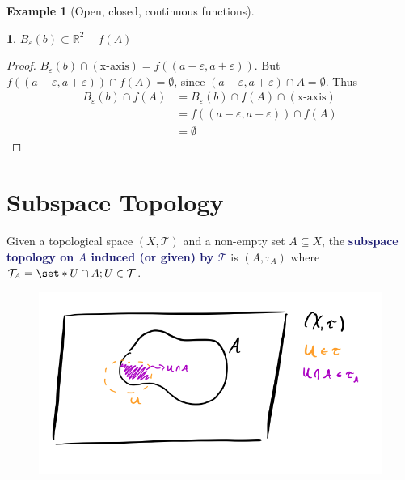 \documentclass[11pt]{article}
\numberwithin{equation}{section}
\newcommand{\navy}[1]{\textcolor{MidnightBlue}{\bf #1}}
\newcounter{theo}[section]\setcounter{theo}{0}
\theoremstyle{definition}
\newtheorem{claim}{\color{ForestGreen}{\textbf{Claim}}}[section]
\theoremstyle{definition}
\newtheorem{example}{\color{WildStrawberry}Example}[section]
\def\Set{\set*}%
\def\ss{\subset}
\def\sse{\subseteq}
\newcommand{\1}{\mathbbm 1}
\def\t{\tau}
\newcommand{\e}{\varepsilon}
\newcommand{\RR}{\mathbb R}
\newcommand{\tT}{\mathcal T}
\begin{document}
\begin{example}[Open, closed, continuous functions]
\begin{enumerate}
\begin{enumerate}
\begin{enumerate}
		 	 	\begin{claim}
		 	 		$B_\e(b) \ss \RR^2 - f(A)$
		 	 	\end{claim}
		 	 	\begin{proof}
		 	 		$B_\e(b) \cap (\text{x-axis}) = f((a-\e,a+\e))$. But $f((a-\e,a+\e)) \cap f(A) = \emptyset$, since $(a-\e,a+\e) \cap A = \emptyset$. Thus
		 	 		\begin{align*}
		 	 			B_\e(b) \cap f(A) &= B_\e(b) \cap f(A) \cap (\text{x-axis}) \\
		 	 			&= f((a-\e,a+\e)) \cap f(A) \\
		 	 			&= \emptyset
		 	 		\end{align*}
		 	 		
		 	 	\end{proof}
		 	 	
		 	 \end{enumerate} 
		 \end{enumerate}
	\end{enumerate}
\end{example}

\section{Subspace Topology}

\begin{definition}
	Given a topological space $(X,\tT)$ and a non-empty set $A \sse X$, the \navy{subspace topology on $A$ induced (or given) by $\tT$} is $(A, \t_A)$ where $\tT_A = \Set{U \cap A; U \in \tT}$. 
\end{definition}

\begin{figure}[H]
	\begin{center}
		\includegraphics[scale=.4]{subspace_topology.png}
	\end{center}
\end{figure}
\end{document}

